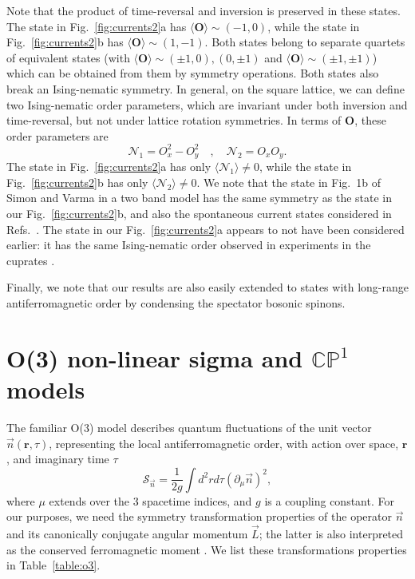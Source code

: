 \documentclass[aps,prb,preprint,onecolumn,citeautoscript,superscriptaddress,footinbib,
eqsecnum]{revtex4-1}
\newcommand{\beq}{\begin{equation}}
\newcommand{\eeq}{\end{equation}}
\begin{document}
Note that the product of time-reversal and inversion is preserved in these states. The state in Fig.~\ref{fig:currents2}a has $\langle {\bm O} \rangle \sim (-1,0)$, while the state in Fig.~\ref{fig:currents2}b has $\langle {\bm O} \rangle \sim (1,-1)$. Both states belong to separate quartets
of equivalent states (with $\langle {\bm O} \rangle \sim (\pm 1,0), (0, \pm 1)$ and 
$\langle {\bm O} \rangle \sim (\pm 1,\pm 1)$) which can be obtained from them by symmetry operations.
Both states also break an Ising-nematic symmetry. In general, on the square lattice, we can define
two Ising-nematic order parameters, which are invariant under both inversion and time-reversal, but
not under lattice rotation symmetries. In terms of ${\bm O}$, these order parameters are
\begin{equation}
    \mathcal{N}_1 = O_x^2 - O_y^2 \quad , \quad \mathcal{N}_2 = O_x O_y . \label{defnematic}
\end{equation}
The state in Fig.~\ref{fig:currents2}a has only $\langle \mathcal{N}_1 \rangle \neq 0$, 
while the state in Fig.~\ref{fig:currents2}b has only $\langle \mathcal{N}_2 \rangle \neq 0$.
We note that the state in Fig.~1b of Simon and Varma \cite{2002PhRvL..89x7003S} in a two band model has
the same symmetry as the state in our Fig.~\ref{fig:currents2}b, and also the spontaneous current 
states considered in Refs.~. 
The state in our Fig.~\ref{fig:currents2}a appears
to not have been considered earlier: it has the same Ising-nematic order observed in experiments in the 
cuprates \cite{2002PhRvL..88m7005A,Hinkov597,2010Natur.463..519D,2010Natur.466..347L}.

Finally, we note that our results are also easily extended to states with long-range antiferromagnetic
order by condensing the spectator bosonic spinons.

\section{O(3) non-linear sigma and $\mathbb{CP}^1$ models}
\label{sec:o3}

The familiar O(3) model describes quantum fluctuations of the unit vector $\vec{n} ( {\bm r}, \tau)$, representing the local
antiferromagnetic order, with action
over space, ${\bm r}$, and imaginary time $\tau$
\beq
\mathcal{S}_{\vec{n}} = \frac{1}{2 g} \int d^2 r d \tau \left( \partial_\mu \vec{n} \right)^2 ,
\eeq
where $\mu$ extends over the 3 spacetime indices, and $g$ is a coupling constant. For our purposes, we need the symmetry transformation
properties of the operator $\vec{n}$ and its canonically conjugate angular momentum $\vec{L}$; the latter is also interpreted as the 
conserved ferromagnetic moment \cite{CHN2}. We list these transformations properties in Table~\ref{table:o3}.
\end{document}
